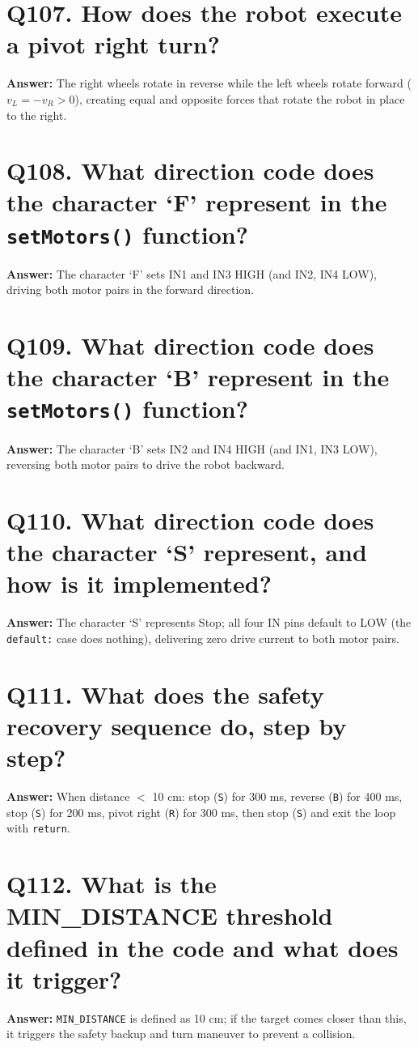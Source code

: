 \documentclass[12pt,a4paper,oneside]{report}
\begin{document}
\section{Q107. How does the robot execute a pivot right turn?}
\textbf{Answer:} The right wheels rotate in reverse while the left wheels rotate forward ($v_L = -v_R > 0$), creating equal and opposite forces that rotate the robot in place to the right.

\section{Q108. What direction code does the character `F' represent in the \texttt{setMotors()} function?}
\textbf{Answer:} The character `F' sets IN1 and IN3 HIGH (and IN2, IN4 LOW), driving both motor pairs in the forward direction.

\section{Q109. What direction code does the character `B' represent in the \texttt{setMotors()} function?}
\textbf{Answer:} The character `B' sets IN2 and IN4 HIGH (and IN1, IN3 LOW), reversing both motor pairs to drive the robot backward.

\section{Q110. What direction code does the character `S' represent, and how is it implemented?}
\textbf{Answer:} The character `S' represents Stop; all four IN pins default to LOW (the \texttt{default:} case does nothing), delivering zero drive current to both motor pairs.

\section{Q111. What does the safety recovery sequence do, step by step?}
\textbf{Answer:} When distance $<$ 10 cm: stop (\texttt{S}) for 300 ms, reverse (\texttt{B}) for 400 ms, stop (\texttt{S}) for 200 ms, pivot right (\texttt{R}) for 300 ms, then stop (\texttt{S}) and exit the loop with \texttt{return}.

\section{Q112. What is the MIN\_DISTANCE threshold defined in the code and what does it trigger?}
\textbf{Answer:} \texttt{MIN\_DISTANCE} is defined as 10 cm; if the target comes closer than this, it triggers the safety backup and turn maneuver to prevent a collision.
\end{document}
